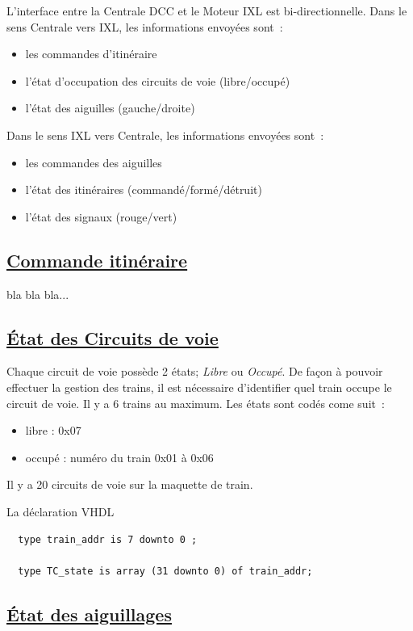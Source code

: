 L'interface entre la Centrale DCC et le Moteur IXL est bi-directionnelle. 
Dans le sens Centrale vers IXL, les informations envoyées sont~:
\begin{itemize}
\item les commandes d'itinéraire
\item l'état d'occupation des circuits de voie (libre/occupé)
\item l'état des aiguilles (gauche/droite)
\end{itemize}

Dans le sens IXL vers Centrale, les informations envoyées sont~:
\begin{itemize}
\item les commandes des aiguilles
\item l'état des itinéraires (commandé/formé/détruit)
\item l'état des signaux (rouge/vert)
\end{itemize}

\subsection{\underline{Commande itinéraire}}
\label{sec:ixl_iti}

bla bla bla...

\subsection{\underline{\'Etat des Circuits de voie}}
\label{sec:ixl_cdv}

Chaque circuit de voie possède 2 états; \emph{Libre} ou
\emph{Occupé}. De façon à pouvoir effectuer la gestion des trains, il
est nécessaire d'identifier quel train occupe le circuit de voie.
Il y a 6 trains au maximum. Les états sont codés come suit~:
\begin{itemize}
  \item libre : 0x07
  \item occupé : numéro du train 0x01 à 0x06
\end{itemize}  

Il y a 20 circuits de voie sur la maquette de train.

\medskip
La déclaration VHDL
\begin{lstlisting}
  type train_addr is 7 downto 0 ;

  type TC_state is array (31 downto 0) of train_addr;
\end{lstlisting}


\subsection{\underline{\'Etat des aiguillages}}
\label{sec:ixl_aig}

